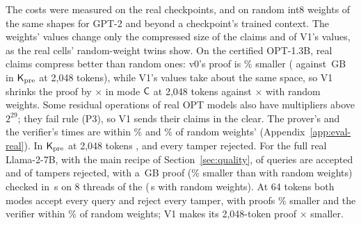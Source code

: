  The costs were measured on the real checkpoints, and on random int8 weights
of the same shapes for GPT-2 and beyond a checkpoint's trained context. The weights' values change
only the compressed size of the claims and of V1's values, as the real cells' random-weight twins
show. On the
certified OPT-1.3B, real claims compress better than random ones: v0's proof is \RealProofSmaller{}\% smaller
(\RealOptMKLongReal{} against \RealOptMKLongRandom{}\,GB in $\mathsf{K}_{\mathrm{pre}}$ at 2{,}048 tokens), while V1's values take about the same
space, so V1 shrinks the proof by \VOneRealOptMLongC{}$\times$ in mode $\mathsf{C}$ at 2{,}048 tokens against \VOneRandomOptMLongC{}$\times$
with random weights. Some residual operations of real OPT models also have multipliers above
$2^{29}$; they fail rule (P3), so V1 sends their claims in the clear. The prover's and the verifier's times are within \RealProveWithin{}\% and
\RealVerifyWithin{}\% of random weights' (Appendix~\ref{app:eval-real}). In $\mathsf{K}_{\mathrm{pre}}$ at 2{,}048 tokens
\RealAcceptedClause{}, and every tamper rejected. For the full real Llama-2-7B, with the main recipe of
Section~\ref{sec:quality}, \RealLlamaAccepted{} of \RealLlamaQueries{} queries are accepted and \RealLlamaTampersRejected{} of \RealLlamaTampers{} tampers
rejected, with a \RealLlamaProof{}\,GB proof (\RealLlamaSmaller{}\% smaller than with random weights) checked in \RealLlamaVerify{}\,s on 8 threads of the
\PlatformCpu{} (\RndLlamaVerify{}\,s with random weights). At 64 tokens both modes accept every query and reject every
tamper, with proofs \RealLlamaShortSmaller{}\% smaller and the verifier within \RealLlamaShortVerifyWithin{}\% of random weights; V1 makes
its 2{,}048-token proof \VOneRealLlamaRatio{}$\times$ smaller.


